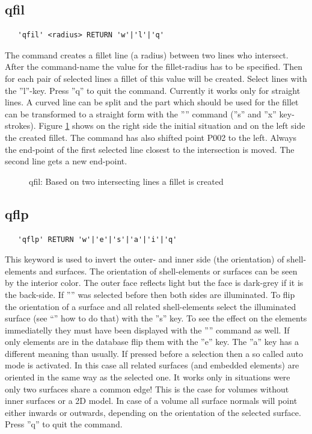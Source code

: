 \documentclass{article}
\begin{document}
\subsection{\label{qfil}qfil}
\begin{verbatim}
   'qfil' <radius> RETURN 'w'|'l'|'q'
\end{verbatim}
The command creates a fillet line (a radius) between two lines who intersect. After the command-name the value for the fillet-radius has to be specified. Then for each pair of selected lines a fillet of this value will be created. Select lines with the ''l''-key. Press ''q'' to quit the command. Currently it works only for straight lines. A curved line can be split and the part which should be used for the fillet can be transformed to a straight form with the '''' command (''s'' and ''x'' key-strokes). Figure \ref{qfilp} shows on the right side the initial situation and on the left side the created fillet. The command has also shifted point P002 to the left. Always the end-point of the first selected line closest to the intersection is moved. The second line gets a new end-point. 
  
\begin{figure}[h]
\caption{\label{qfilp}qfil: Based on two intersecting lines a fillet is created }
\end{figure}

\subsection{\label{qflp}qflp}
\begin{verbatim}
   'qflp' RETURN 'w'|'e'|'s'|'a'|'i'|'q'
\end{verbatim}
This keyword is used to invert the outer- and inner side (the orientation) of shell-elements and surfaces. The orientation of shell-elements or surfaces can be seen by the interior color. The outer face reflects light but the face is dark-grey if it is the back-side. If '''' was selected before then both sides are illuminated. To flip the orientation of a surface and all related shell-elements select the illuminated surface (see ``'' how to do that) with the ''s'' key. To see the effect on the elements immediatelly they must have been displayed with the '''' command as well. If only elements are in the database flip them with the ''e'' key. The ''a'' key has a different meaning than usually. If pressed before a selection then a so called auto mode is activated. In this case all related surfaces (and embedded elements) are oriented in the same way as the selected one. It works only in situations were only two surfaces share a common edge! This is the case for volumes without inner surfaces or a 2D model. In case of a volume all surface normals will point either inwards or outwards, depending on the orientation of the selected surface. Press ''q'' to quit the command. 
\end{document}
